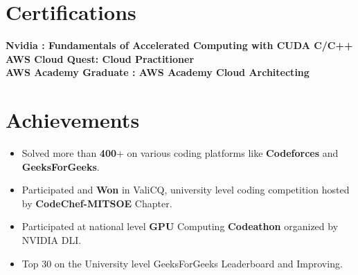\documentclass[letterpaper,11pt]{article}
\makeatletter
\newcommand{\resumeItem}[1]{
  \item\small{
    {#1 \vspace{-2pt}}
  }
}
\newcommand{\resumeSubheading}[4]{
  \vspace{-2pt}\item
    \begin{tabular*}{1.0\textwidth}[t]{l@{\extracolsep{\fill}}r}
      \textbf{#1} & \textbf{\small #2} \\
      \textit{\small#3} & \textit{\small #4} \\
    \end{tabular*}\vspace{-7pt}
}
\newcommand{\resumeSubHeadingListStart}{\begin{itemize}[leftmargin=0.0in, label={}]}
\newcommand{\resumeSubHeadingListEnd}{\end{itemize}}
\newcommand{\resumeItemListStart}{\begin{itemize}}
\newcommand{\resumeItemListEnd}{\end{itemize}\vspace{-5pt}}
\makeatother
\begin{document}
%
\section{Certifications}
 \begin{itemize}[leftmargin=0.15in, label={}]
    \small{\item{
     \textbf{Nvidia : Fundamentals of Accelerated Computing with CUDA C/C++} \\
     \textbf{AWS Cloud Quest: Cloud Practitioner} \\
     \textbf{AWS Academy Graduate : AWS Academy Cloud Architecting}
    }}
 \end{itemize}
 \vspace{-16pt}


\section{Achievements}
    \resumeSubHeadingListStart
        \resumeItemListStart
            \resumeItem{Solved more than \textbf{400}+ on various coding platforms 
             like \textbf{Codeforces} and \textbf{GeeksForGeeks}.}
            \resumeItem{Participated and \textbf{Won} in ValiCQ, university level coding competition hosted by \textbf{CodeChef-MITSOE} Chapter.}
            \resumeItem{Participated at national level \textbf{GPU} Computing \textbf{Codeathon} organized by NVIDIA DLI.}
            \resumeItem{Top 30 on the University level GeeksForGeeks Leaderboard and Improving.}
        \resumeItemListEnd
     \resumeSubHeadingListEnd
        
    
        
\end{document}
